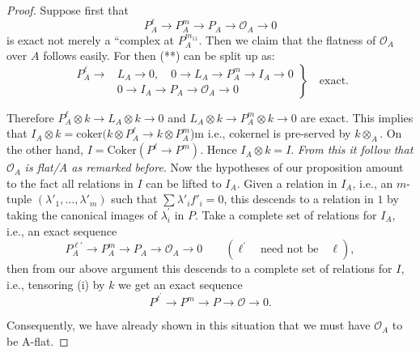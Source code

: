 {\begin{proof}
Suppose first that
\begin{equation*}
P_A^{\ell}\rightarrow P_A^{m}\rightarrow P_A \rightarrow \mathscr{O}_A\rightarrow 0\tag{*}
\end{equation*}\pageoriginale
is exact not merely a ``complex at $P_A^{m_{11}}$. Then we claim that the flatness of $\mathscr{O}_A$ over $A$ follows easily. For then (**) can be split up as:
\begin{equation*}
\left.
\begin{aligned}
P_A^{\ell}\rightarrow &L_A\rightarrow 0,\quad 0\rightarrow L_A \rightarrow P_A^{m}\rightarrow I_A \rightarrow 0\\
&0\rightarrow I_A\rightarrow P_A \rightarrow \mathscr{O}_A \rightarrow 0
\end{aligned}
\right\}
\quad\text{exact.}
\end{equation*}

Therefore $P_A^{\ell}\otimes k\rightarrow L_A \otimes k\rightarrow 0$
and $L_A\otimes k\rightarrow P_A^{m}\otimes k\rightarrow 0$ are
exact. This implies that $I_A\otimes k=\text{coker}(k\otimes
P_A^{\ell}\rightarrow k\otimes P_A^{m}$)m i.e., cokernel is pre-served
by $k\otimes_A$. On the other hand,
$I=\text{Coker}(P^{\ell}\rightarrow P^{m})$. Hence $I_A\otimes
k=I$. {\em From this it follow that} $\mathscr{O}_A$ {\em is flat/A as
remarked before}. Now the hypotheses of our proposition amount to the
fact all relations in $I$ can be lifted to $I_A$. Given a relation in
$I_A$, i.e., an $m$-tuple $(\lambda'_1,\ldots,\lambda'_m)$ such
that $\sum\lambda'_{i}f'_{i}=0$, this descends to a relation in
$1$ by taking the canonical images of $\lambda^{'}_i$ in $P$. Take a
complete set of relations for $I_A$, i.e., an exact sequence 
\begin{equation*}
P_A^{\ell'}\rightarrow P_A^{m}\rightarrow P_A\rightarrow \mathscr{O}_A\rightarrow 0\qquad (\ell^{'}\quad \text{need not be}\quad\ell),\tag{i}
\end{equation*}
then from our above argument this descends to a complete set of relations for $I$, i.e., tensoring (i) by $k$ we get an exact sequence
\begin{equation*}
P^{\ell^{'}}\rightarrow P^{m}\rightarrow P \rightarrow \mathscr{O}\rightarrow 0.
\end{equation*}

Consequently, we have already shown in this situation that we must have $\mathscr{O}_A$ to be A-flat.
\end{proof}

}
